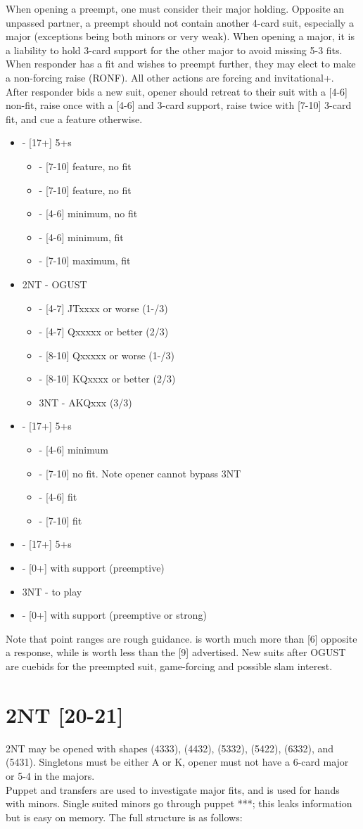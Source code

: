 \documentclass[12pt]{report}
\newcommand{\n}{\\}
\newcommand{\ul}[1]{\begin{itemize}#1\end{itemize}}
\newcommand{\li}{\item[~]}
\newcommand{\bidsection}[2]{\section{\texorpdfstring{#1}{#2}}}
\begin{document}
    When opening a preempt, one must consider their major holding.  Opposite an unpassed partner, a preempt should not contain another 4-card suit, especially a major (exceptions being both minors or very weak).  When opening a major, it is a liability to hold 3-card support for the other major to avoid missing 5-3 fits.  When responder has a fit and wishes to preempt further, they may elect to make a non-forcing raise (RONF).  All other actions are forcing and invitational+.\n
    
    After responder bids a new suit, opener should retreat to their suit with a [4-6] non-fit, raise once with a [4-6] and 3-card support, raise twice with [7-10] 3-card fit, and cue a feature otherwise.

    \ul {
        \li {} - [17+] 5+\sp{}s
        \ul {
            \li \cl3 - [7-10] feature, no fit
            \li \di3 - [7-10] feature, no fit
            \li \he3 - [4-6] minimum, no fit
            \li \sp3 - [4-6] minimum, fit
            \li \sp4 - [7-10] maximum, fit
        }
        \li 2NT - OGUST
        \ul {
            \li \cl3 - [4-7] JTxxxx or worse (1-/3)
            \li \di3 - [4-7] Qxxxxx or better (2/3)
            \li \sp3 - [8-10] Qxxxxx or worse (1-/3)
            \li \sp3 - [8-10] KQxxxx or better (2/3)
            \li 3NT - AKQxxx (3/3)
        }
        \li \cl3 - [17+] 5+\cl{}s
        \ul {
            \li \he3 - [4-6] minimum
            \li \sp3 - [7-10] no fit.  Note opener cannot bypass 3NT
            \li \cl4 - [4-6] fit
            \li \cl5 - [7-10] fit
        }
        \li \di3 - [17+] 5+\di{}s
        \li \he3 - [0+] with support (preemptive)
        \li 3NT - to play
        \li \he4 - [0+] with support (preemptive or strong)
    }

    Note that point ranges are rough guidance.  is worth much more than [6] opposite a  response, while  is worth less than the [9] advertised.  New suits after OGUST are cuebids for the preempted suit, game-forcing and possible slam interest.
\newpage

\bidsection{2NT [20-21]}{2NT [20-21]} \label{2:9}

    2NT may be opened with shapes (4333), (4432), (5332), (5422), (6332), and (5431).  Singletons must be either A or K, opener must not have a 6-card major or 5-4 in the majors.\n

    Puppet and transfers are used to investigate major fits, and  is used for hands with minors.  Single suited minors go through puppet ***; this leaks information but is easy on memory. The full structure is as follows:
\end{document}
